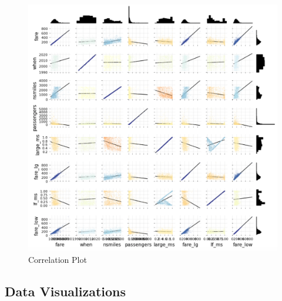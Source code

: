 \documentclass{article}
\begin{document}
\begin{figure}[h]
\centering
\includegraphics[scale=.4]{images/corr_plot.png}
\caption{Correlation Plot}
\end{figure}

\subsection{Data Visualizations}
\end{document}
